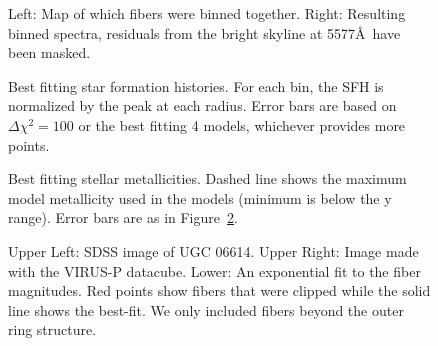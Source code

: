 \documentclass{emulateapj}
\begin{document}


\begin{figure}
\caption{Left:  Map of which fibers were binned together.  Right:  Resulting binned spectra, residuals from the bright skyline at 5577\AA\ have been masked. \label{malin2_binmap}}
\end{figure}




\begin{figure}
\caption{ Best fitting star formation histories.  For each bin, the SFH is normalized by the peak at each radius.  Error bars are based on $\Delta\chi^2=100$ or the best fitting 4 models, whichever provides more points.  \label{sfh_malin2} }
\end{figure}


\begin{figure}
\caption{Best fitting stellar metallicities.   Dashed line shows the maximum model metallicity used in the models (minimum is below the y range).  Error bars are as in Figure~\ref{sfh_malin2}. \label{metal_malin2}}
\end{figure}


\begin{figure}
\caption{Upper Left:  SDSS image of UGC 06614.  Upper Right:  Image made with the VIRUS-P datacube.  Lower:  An exponential fit to the fiber magnitudes.  Red points show fibers that were clipped while the solid line shows the best-fit.  We only included fibers beyond the outer ring structure.  \label{ugc_fibers} }
\end{figure}
\end{document}
